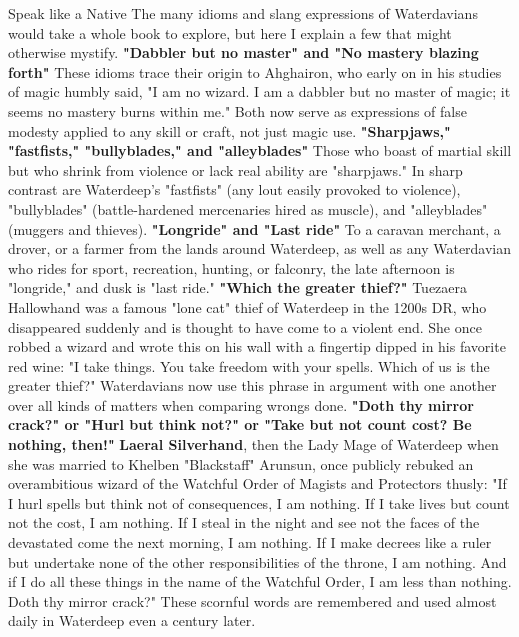 \documentclass[10pt,a4paper,twoside,twocolumn,openany,nodeprecatedcode]{dndbook}
\begin{document}
\begin{DndComment}{Speak like a Native}
The many idioms and slang expressions of Waterdavians would take a whole book to explore, but here I explain a few that might otherwise mystify.
\textbf{"Dabbler but no master" and "No mastery blazing forth"} These idioms trace their origin to Ahghairon, who early on in his studies of magic humbly said, "I am no wizard. I am a dabbler but no master of magic; it seems no mastery burns within me." Both now serve as expressions of false modesty applied to any skill or craft, not just magic use.
\textbf{"Sharpjaws," "fastfists," "bullyblades," and "alleyblades"} Those who boast of martial skill but who shrink from violence or lack real ability are "sharpjaws." In sharp contrast are Waterdeep's "fastfists" (any lout easily provoked to violence), "bullyblades" (battle-hardened mercenaries hired as muscle), and "alleyblades" (muggers and thieves).
\textbf{"Longride" and "Last ride"} To a caravan merchant, a drover, or a farmer from the lands around Waterdeep, as well as any Waterdavian who rides for sport, recreation, hunting, or falconry, the late afternoon is "longride," and dusk is "last ride."
\textbf{"Which the greater thief?"} Tuezaera Hallowhand was a famous "lone cat" thief of Waterdeep in the 1200s DR, who disappeared suddenly and is thought to have come to a violent end. She once robbed a wizard and wrote this on his wall with a fingertip dipped in his favorite red wine: "I take things. You take freedom with your spells. Which of us is the greater thief?" Waterdavians now use this phrase in argument with one another over all kinds of matters when comparing wrongs done.
\textbf{"Doth thy mirror crack?" or "Hurl but think not?" or "Take but not count cost? Be nothing, then!"} \textbf{Laeral Silverhand}, then the Lady Mage of Waterdeep when she was married to Khelben "Blackstaff" Arunsun, once publicly rebuked an overambitious wizard of the Watchful Order of Magists and Protectors thusly: "If I hurl spells but think not of consequences, I am nothing. If I take lives but count not the cost, I am nothing. If I steal in the night and see not the faces of the devastated come the next morning, I am nothing. If I make decrees like a ruler but undertake none of the other responsibilities of the throne, I am nothing. And if I do all these things in the name of the Watchful Order, I am less than nothing. Doth thy mirror crack?"
These scornful words are remembered and used almost daily in Waterdeep even a century later.
\end{DndComment}
\end{document}
